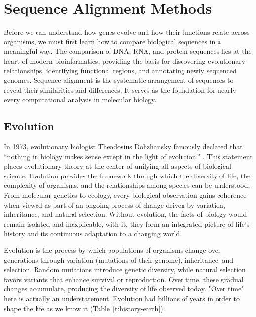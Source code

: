 \chapter{Sequence Alignment Methods}
\label{ch:alignment}

Before we can understand how genes evolve and how their functions relate across organisms,  we must first learn how to compare biological sequences in a meaningful way.  The comparison of DNA, RNA, and protein sequences lies at the heart of modern bioinformatics, providing the basis for discovering evolutionary relationships, identifying functional regions, and annotating newly sequenced genomes. Sequence alignment is the systematic arrangement of sequences to reveal their similarities and differences. It serves as the foundation for nearly every computational analysis in molecular biology.

\section{Evolution}

In 1973, evolutionary biologist Theodosius Dobzhansky famously declared that ``nothing in biology makes sense except in the light of evolution.''
.
This statement places evolutionary theory at the center of unifying all aspects of biological science. Evolution provides the framework through which the diversity of life, the complexity of organisms, and the relationships among species can be understood. From molecular genetics to ecology, every biological observation gains coherence when viewed as part of an ongoing process of change driven by variation, inheritance, and natural selection. Without evolution, the facts of biology would remain isolated and inexplicable, with it, they form an integrated picture of life’s history and its continuous adaptation to a changing world.

Evolution 
is the process by which populations of organisms change over generations through variation (mutations of their genome), inheritance, and selection. Random mutations introduce genetic diversity, while natural selection favors variants that enhance survival or reproduction. Over time, these gradual changes accumulate, producing the diversity of life observed today. "Over time" here is actually an understatement. Evolution had billions of years in order to shape the life as we know it (Table~\ref{t:history-earth}).

